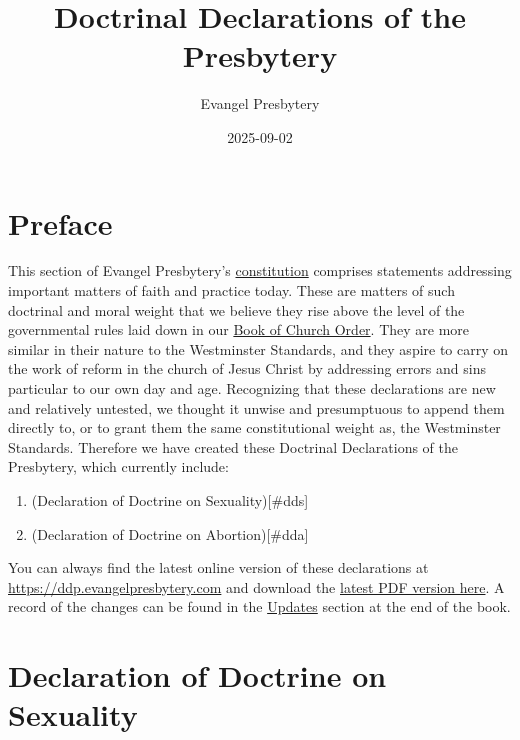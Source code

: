 \documentclass[
]{book}
\title{Doctrinal Declarations of the Presbytery}
\author{Evangel Presbytery}
\date{2025-09-02}
\begin{document}
\maketitle



{
\hypersetup{linkcolor=}
\setcounter{tocdepth}{1}
\tableofcontents
}
\hypertarget{preface}{%
\chapter*{Preface}\label{preface}}

This section of Evangel Presbytery's \href{https://bco.evangelpresbytery.com/preface.html\#c.-constitution-defined}{constitution} comprises statements addressing important matters of faith and practice today. These are matters of such doctrinal and moral weight that we believe they rise above the level of the governmental rules laid down in our \href{https://bco.evangelpresbytery.com/}{Book of Church Order}. They are more similar in their nature to the Westminster Standards, and they aspire to carry on the work of reform in the church of Jesus Christ by addressing errors and sins particular to our own day and age. Recognizing that these declarations are new and relatively untested, we thought it unwise and presumptuous to append them directly to, or to grant them the same constitutional weight as, the Westminster Standards. Therefore we have created these Doctrinal Declarations of the Presbytery, which currently include:

\begin{enumerate}
\def\labelenumi{\arabic{enumi}.}
\item
  (Declaration of Doctrine on Sexuality){[}\#dds{]}
\item
  (Declaration of Doctrine on Abortion){[}\#dda{]}
\end{enumerate}

You can always find the latest online version of these declarations at \url{https://ddp.evangelpresbytery.com} and download the \href{https://ddp.evangelpresbytery.com/evangel-presbytery-ddp.pdf}{latest PDF version here}. A record of the changes can be found in the \href{https://ddp.evangelpresbytery.com/updates.html}{Updates} section at the end of the book.

\mainmatter

\hypertarget{declaration-of-doctrine-on-sexuality}{%
\chapter*{Declaration of Doctrine on Sexuality}\label{declaration-of-doctrine-on-sexuality}}
\end{document}
